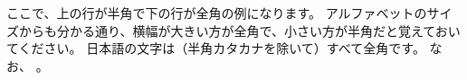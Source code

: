 ここで、上の行が半角で下の行が全角の例になります。
アルファベットのサイズからも分かる通り、横幅が大きい方が全角で、小さい方が半角だと覚えておいてください。
日本語の文字は（半角カタカナを除いて）すべて全角です。
なお、
\textbf{\color{red}{プログラミングでアルファベットや記号を入力するときは、必ず半角文字(小さい文字)を使いましょう}}。








